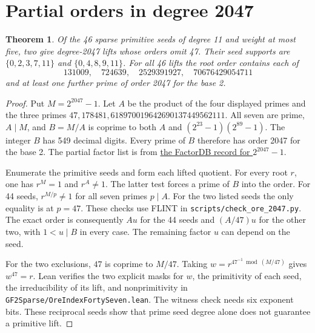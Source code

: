 \documentclass[11pt]{article}
\newtheorem{theorem}{Theorem}
\begin{document}
\section{Partial orders in degree 2047}\label{sec:ore2047}
\begin{theorem}
Of the 46 sparse primitive seeds of degree 11 and weight at most five,
two give degree-2047 lifts whose orders omit 47. Their seed supports
are \(\{0,2,3,7,11\}\) and \(\{0,4,8,9,11\}\).
For all 46 lifts the root order contains each of
\[
 131009,\quad 724639,\quad 2529391927,\quad 70676429054711
\]
and at least one further prime of order 2047 for the base 2.
\end{theorem}
\begin{proof}
Put \(M=2^{2047}-1\). Let \(A\) be the product of the four displayed
primes and the three primes \(47,178481,618970019642690137449562111\).
All seven are prime, \(A\mid M\), and \(B=M/A\) is coprime to
both \(A\) and \((2^{23}-1)(2^{89}-1)\). The integer \(B\) has
549 decimal digits. Every prime of \(B\) therefore has order 2047
for the base 2. The partial factor list is from
\href{https://factordb.com/index.php?id=1000000000000002047}
{the FactorDB record for \(2^{2047}-1\)}.

Enumerate the primitive seeds and form each lifted quotient.
For every root \(r\), one has \(r^M=1\) and \(r^A\ne1\).
The latter test forces a prime of \(B\) into the order.
For 44 seeds, \(r^{M/p}\ne1\) for all seven primes \(p\mid A\).
For the two listed seeds the only equality is at \(p=47\).
These checks use FLINT in \nolinkurl{scripts/check_ore_2047.py}.
The exact order is consequently \(Au\) for the 44 seeds and
\((A/47)u\) for the other two, with \(1<u\mid B\) in every case.
The remaining factor \(u\) can depend on the seed.

For the two exclusions, \(47\) is coprime to \(M/47\).
Taking \(w=r^{47^{-1}\bmod(M/47)}\) gives \(w^{47}=r\).
Lean verifies the two explicit masks for \(w\), the primitivity
of each seed, the irreducibility of its lift, and nonprimitivity
in \nolinkurl{GF2Sparse/OreIndexFortySeven.lean}. The witness check
needs six exponent bits. These reciprocal seeds show that prime
seed degree alone does not guarantee a primitive lift.
\end{proof}
\end{document}
